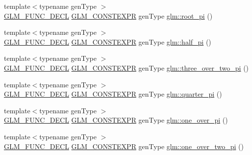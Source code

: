 \begin{DoxyCompactItemize}
\item 
{\footnotesize template$<$typename gen\+Type $>$ }\\\hyperlink{setup_8hpp_ab2d052de21a70539923e9bcbf6e83a51}{G\+L\+M\+\_\+\+F\+U\+N\+C\+\_\+\+D\+E\+CL} \hyperlink{setup_8hpp_a08b807947b47031d3a511f03f89645ad}{G\+L\+M\+\_\+\+C\+O\+N\+S\+T\+E\+X\+PR} gen\+Type \hyperlink{group__gtc__constants_ga261380796b2cd496f68d2cf1d08b8eb9}{glm\+::root\+\_\+pi} ()
\item 
{\footnotesize template$<$typename gen\+Type $>$ }\\\hyperlink{setup_8hpp_ab2d052de21a70539923e9bcbf6e83a51}{G\+L\+M\+\_\+\+F\+U\+N\+C\+\_\+\+D\+E\+CL} \hyperlink{setup_8hpp_a08b807947b47031d3a511f03f89645ad}{G\+L\+M\+\_\+\+C\+O\+N\+S\+T\+E\+X\+PR} gen\+Type \hyperlink{group__gtc__constants_ga0c36b41d462e45641faf7d7938948bac}{glm\+::half\+\_\+pi} ()
\item 
{\footnotesize template$<$typename gen\+Type $>$ }\\\hyperlink{setup_8hpp_ab2d052de21a70539923e9bcbf6e83a51}{G\+L\+M\+\_\+\+F\+U\+N\+C\+\_\+\+D\+E\+CL} \hyperlink{setup_8hpp_a08b807947b47031d3a511f03f89645ad}{G\+L\+M\+\_\+\+C\+O\+N\+S\+T\+E\+X\+PR} gen\+Type \hyperlink{group__gtc__constants_gae94950df74b0ce382b1fc1d978ef7394}{glm\+::three\+\_\+over\+\_\+two\+\_\+pi} ()
\item 
{\footnotesize template$<$typename gen\+Type $>$ }\\\hyperlink{setup_8hpp_ab2d052de21a70539923e9bcbf6e83a51}{G\+L\+M\+\_\+\+F\+U\+N\+C\+\_\+\+D\+E\+CL} \hyperlink{setup_8hpp_a08b807947b47031d3a511f03f89645ad}{G\+L\+M\+\_\+\+C\+O\+N\+S\+T\+E\+X\+PR} gen\+Type \hyperlink{group__gtc__constants_ga3c9df42bd73c519a995c43f0f99e77e0}{glm\+::quarter\+\_\+pi} ()
\item 
{\footnotesize template$<$typename gen\+Type $>$ }\\\hyperlink{setup_8hpp_ab2d052de21a70539923e9bcbf6e83a51}{G\+L\+M\+\_\+\+F\+U\+N\+C\+\_\+\+D\+E\+CL} \hyperlink{setup_8hpp_a08b807947b47031d3a511f03f89645ad}{G\+L\+M\+\_\+\+C\+O\+N\+S\+T\+E\+X\+PR} gen\+Type \hyperlink{group__gtc__constants_ga555150da2b06d23c8738981d5013e0eb}{glm\+::one\+\_\+over\+\_\+pi} ()
\item 
{\footnotesize template$<$typename gen\+Type $>$ }\\\hyperlink{setup_8hpp_ab2d052de21a70539923e9bcbf6e83a51}{G\+L\+M\+\_\+\+F\+U\+N\+C\+\_\+\+D\+E\+CL} \hyperlink{setup_8hpp_a08b807947b47031d3a511f03f89645ad}{G\+L\+M\+\_\+\+C\+O\+N\+S\+T\+E\+X\+PR} gen\+Type \hyperlink{group__gtc__constants_ga7c922b427986cbb2e4c6ac69874eefbc}{glm\+::one\+\_\+over\+\_\+two\+\_\+pi} ()

\end{DoxyCompactItemize}
